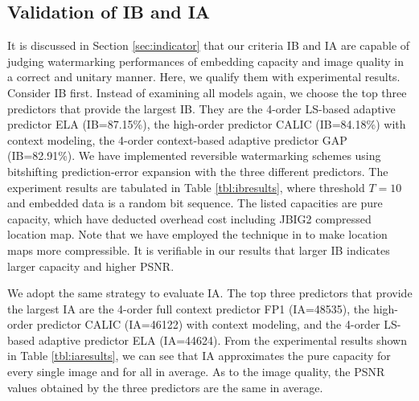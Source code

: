 \documentclass[journal]{IEEEtran}
\begin{document}
\subsection{Validation of IB and IA}\label{sub:valid}
It is discussed in Section \ref{sec:indicator} that our criteria IB and IA are capable of judging
watermarking performances of embedding capacity and image quality in a correct and unitary manner.
Here, we qualify them with experimental results. Consider IB first. Instead of examining all models
again, we choose the top three predictors that provide the largest IB. They are the 4-order LS-based
adaptive predictor ELA (IB=87.15\%), the high-order predictor CALIC (IB=84.18\%) with context
modeling, the 4-order context-based adaptive predictor GAP (IB=82.91\%). We have implemented
reversible watermarking schemes using bitshifting prediction-error expansion with the three
different predictors. The experiment results are tabulated in Table \ref{tbl:ibresults}, where
threshold $T=10$ and embedded data is a random bit sequence. The listed capacities are pure
capacity, which have deducted overhead cost including JBIG2 compressed location map. Note that we
have employed the technique in \cite{Chang07letter} to make location maps more compressible. It is
verifiable in our results that larger IB indicates larger capacity and higher PSNR. 

We adopt the same strategy to evaluate IA. The top three predictors that provide the largest IA are
the 4-order full context predictor FP1 (IA=48535), the high-order predictor CALIC (IA=46122) with
context modeling, and the 4-order LS-based adaptive predictor ELA (IA=44624). From the experimental
results shown in Table \ref{tbl:iaresults}, we can see that IA approximates the pure capacity for
every single image and for all in average. As to the image quality, the PSNR values obtained by the
three predictors are the same in average.
\end{document}

